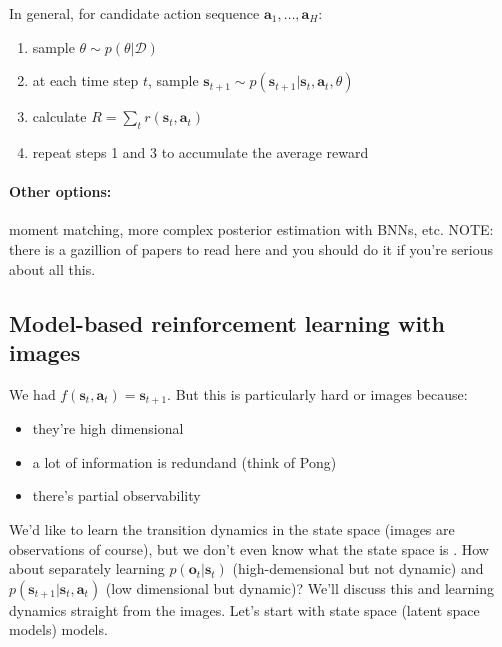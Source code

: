 \documentclass{report}
\begin{document}
In general, for candidate action sequence $ \bm{a}_{1}, \dots , \bm{a}_{H}$:
\begin{enumerate}
		\item sample $\theta \sim p(\theta|\mathcal{D})$
		\item at each time step $t$, sample $\bm{s}_{t+1} \sim p(\bm{s}_{t+1}| \bm{s}_{t}, \bm{a}_{t}, \theta)$
		\item calculate $R = \sum_{t}^{} r (\bm{s}_{t}, \bm{a}_{t} )$
		\item repeat steps 1 and 3 to accumulate the average reward
\end{enumerate}
\paragraph{Other options:} moment matching, more complex posterior estimation with BNNs, etc.
NOTE: there is a gazillion of papers to read here and you should do it if you're serious about all this.

\subsection{Model-based reinforcement learning with images}
We had $f (\bm{s}_{t}, \bm{a}_{t} )= \bm{s}_{t+1}$.
But this is particularly hard or images because:
\begin{itemize}
		\item they're high dimensional
		\item a lot of information is redundand (think of Pong)
		\item there's partial observability
\end{itemize}
We'd like to learn the transition dynamics in the state space (images are observations of course), 
but we don't even know what the state space is .
How about separately learning $p(\bm{o}_{t}| \bm{s}_{t})$ (high-demensional but not dynamic) 
and $p(\bm{s}_{t+1}|\bm{s}_{t}, \bm{a}_{t})$ (low dimensional but dynamic)?
We'll discuss this and learning dynamics straight from the images.
Let's start with state space (latent space models) models.
\end{document}

